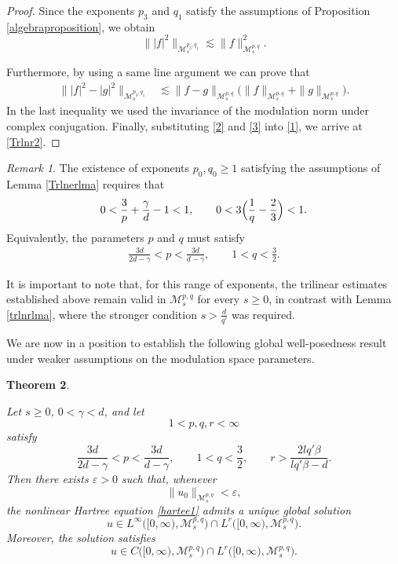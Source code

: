 \documentclass[12pt,reqno,a4paper]{amsart}
\numberwithin{equation}{section}
\theoremstyle{plain}
\newtheorem{theorem}{Theorem}[section]
\theoremstyle{definition}
\theoremstyle{remark}
\newtheorem{remark}[theorem]{Remark}
\def\M{\mathcal{M}}
\def \M{{\mathcal M}}
\begin{document}
\begin{proof}
Since the exponents $p_{3}$ and $q_{1}$ satisfy the assumptions of
Proposition \ref{algebraproposition}, we obtain
\begin{equation}
\label{2}
\||f|^{2}\|_{\M^{p_{3},q_{1}}_{s}}
\lesssim
\|f\|_{\M^{p,q}_{s}}^{2}.
\end{equation}

Furthermore, by using a same line argument we can prove that 
\begin{align}
\label{3}
\||f|^{2}-|g|^{2}\|_{\M^{p_{3},q_{1}}_{s}}
&\lesssim
\|f-g\|_{\M^{p,q}_{s}}
\bigl(
\|f\|_{\M^{p,q}_{s}}
+
\|g\|_{\M^{p,q}_{s}}
\bigr).
\end{align}
In the last inequality we used the invariance of the modulation norm
under complex conjugation.
Finally, substituting \eqref{2} and \eqref{3} into \eqref{1}, we arrive at
\eqref{Trlnr2}.
\end{proof}
\begin{remark}
The existence of exponents $p_{0},q_{0}\geq 1$ satisfying the
assumptions of Lemma \ref{Trlnerlma} requires that
\[
0<
\frac{3}{p}
+\frac{\gamma}{d}
-1
<1,
\qquad
0<
3\Bigl(\frac{1}{q}-\frac{2}{3}\Bigr)
<1.
\]
Equivalently, the parameters $p$ and $q$ must satisfy
\begin{align}
\frac{3d}{2d-\gamma}
<
p
<
\frac{3d}{d-\gamma},
\qquad
1<q<\frac{3}{2}.
\end{align}

It is important to note that, for this range of exponents, the
trilinear estimates established above remain valid in
$\M^{p,q}_{s}$ for every $s\geq 0$, in contrast with
Lemma \ref{trlnrlma}, where the stronger condition
$s>\frac{d}{q'}$ was required.
\end{remark}

We are now in a position to establish the following global
well-posedness result under weaker assumptions on the modulation space
parameters.

\begin{theorem}
\label{welposedness2}

Let $s\geq 0$, $0<\gamma<d$, and let
\[
1<p,q,r<\infty
\]
satisfy
\[
\frac{3d}{2d-\gamma}
<
p
<
\frac{3d}{d-\gamma},
\qquad
1<q<\frac{3}{2},
\qquad
r>
\frac{2lq'\beta}{lq'\beta-d}.
\]
Then there exists $\varepsilon>0$ such that, whenever
\[
\|u_{0}\|_{\M^{p,q}_{s}}<\varepsilon,
\]
the nonlinear Hartree equation \eqref{hartee1} admits a unique global solution
\[
u
\in
L^{\infty}\bigl([0,\infty),\M^{p,q}_{s}\bigr)
\cap
L^{r}\bigl([0,\infty),\M^{p,q}_{s}\bigr).
\]
Moreover, the solution satisfies
\[
u
\in
C\bigl([0,\infty),\M^{p,q}_{s}\bigr)
\cap
L^{r}\bigl([0,\infty),\M^{p,q}_{s}\bigr).
\]
\end{theorem}
\end{document}
